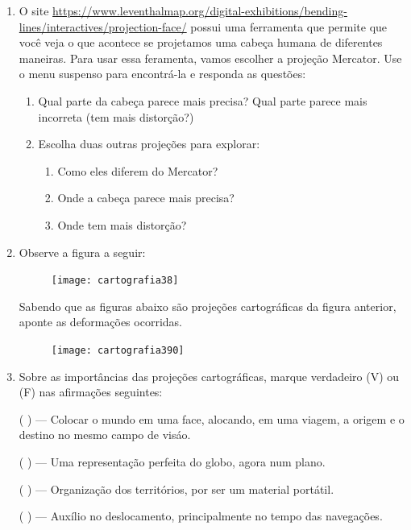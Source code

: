 \begin{enumerate}

\item O site \url{https://www.leventhalmap.org/digital-exhibitions/bending-lines/interactives/projection-face/} possui uma ferramenta que permite que você veja o que acontece se projetamos uma cabeça humana de diferentes maneiras.  Para usar essa feramenta, vamos escolher a projeção Mercator. Use o menu suspenso para encontrá-la e responda as questões:
\begin{enumerate}
\item Qual parte da cabeça parece mais precisa? Qual parte parece mais incorreta (tem mais distorção?)
\item Escolha duas outras projeções para explorar:
\begin{enumerate}
\item Como eles diferem do Mercator?
\item Onde a cabeça parece mais precisa?
\item  Onde tem mais distorção?
\end{enumerate}
\end{enumerate}



\item Observe a figura a seguir: 

\begin{figure}[H]
\centering
\texttt{[image: cartografia38]}
\end{figure}

Sabendo que as figuras abaixo são projeções cartográficas da figura anterior, aponte as deformações ocorridas.

\begin{figure}[H]
\centering
\texttt{[image: cartografia390]}
\end{figure}


\item Sobre as importâncias das projeções cartográficas, marque verdadeiro (V) ou (F) nas afirmações seguintes:

({ }{ }{ }) --- Colocar o mundo em uma face, alocando, em uma viagem, a origem e o destino no mesmo campo de visáo.

({ }{ }{ }) --- Uma representação perfeita do globo, agora num plano.

({ }{ }{ }) --- Organização dos territórios, por ser um material portátil.

({ }{ }{ }) --- Auxílio no deslocamento, principalmente no tempo das navegações.


\end{enumerate}
